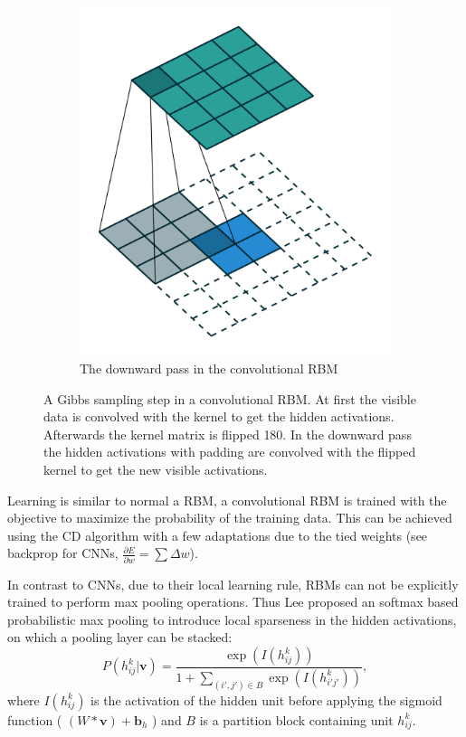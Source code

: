 \begin{figure}
\begin{subfigure}[t]{.30\textwidth}
  		\includegraphics[width=.8\linewidth]{imgs/crbm_padding2.png}
  		\caption{The downward pass in the convolutional RBM}
  		\label{fig:sub3}
	\end{subfigure}
	\caption{A Gibbs sampling step in a convolutional RBM. At first the visible data is convolved with the kernel to get the hidden activations. Afterwards the kernel matrix is flipped 180\textdegree . In the downward pass the hidden activations with padding are convolved with the flipped kernel to get the new visible activations.}
	\label{fig:convrbm}
\end{figure}


Learning is similar to normal a RBM, a convolutional RBM is trained with the objective to maximize the probability of the training data.
This can be achieved using the CD algorithm with a few adaptations due to the tied weights (see backprop for CNNs, $\frac{\partial E}{\partial w} = \sum \Delta w$).

In contrast to CNNs, due to their local learning rule, RBMs can not be explicitly trained to perform max pooling operations.
Thus Lee proposed an softmax based probabilistic max pooling to introduce local sparseness in the hidden activations, on which a pooling layer can be stacked:
\[
P(h^k_{ij} | \textbf{v}) = \frac{\exp(I(h^k_{ij}))}{1 + \sum_{(i',j') \in B} \exp(I(h^k_{i'j'}))},
\]
where $I(h^k_{ij})$ is the activation of the hidden unit before applying the sigmoid function ( $(W * \textbf{v}) + \textbf{b}_{h}$ ) and $B$ is a partition block containing unit $h^k_{ij}$. 


